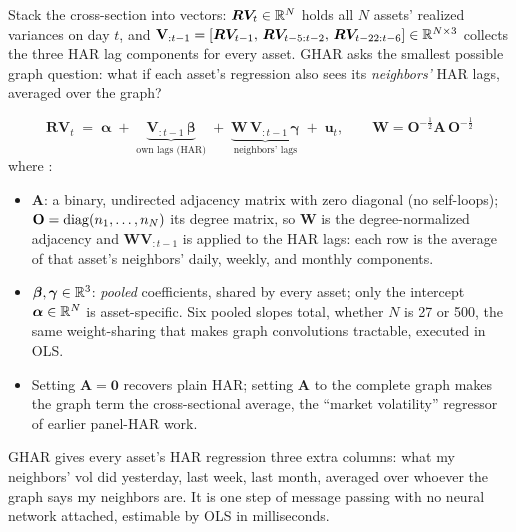 Stack the cross-section into vectors: $\boldsymbol{RV}_t \in \mathbb{R}^N$ holds all $N$ assets' realized variances on day $t$, and $\mathbf{V}_{:t-1} = [\boldsymbol{RV}_{t-1},\, \boldsymbol{RV}_{t-5:t-2},\, \boldsymbol{RV}_{t-22:t-6}] \in \mathbb{R}^{N \times 3}$ collects the three HAR lag components for every asset. GHAR asks the smallest possible graph question: what if each asset's regression also sees its \emph{neighbors'} HAR lags, averaged over the graph?

\begin{equation}\label{eq:gnn:ghar}
  \boldsymbol{RV}_t \;=\; \boldsymbol{\alpha}
  \;+\; \underbrace{\mathbf{V}_{:t-1}\,\bm{\beta}}_{\text{own lags (HAR)}}
  \;+\; \underbrace{\mathbf{W}\,\mathbf{V}_{:t-1}\,\bm{\gamma}}_{\text{neighbors' lags}}
  \;+\; \boldsymbol{u}_t,
  \qquad
  \mathbf{W} = \mathbf{O}^{-\frac{1}{2}} \mathbf{A}\, \mathbf{O}^{-\frac{1}{2}}
\end{equation}
where \citep[eq.~6, p.~8]{ZhangCucuringuDong2023}:
\begin{itemize}[nosep]
  \item $\mathbf{A}$: a binary, undirected adjacency matrix with zero diagonal (no self-loops); $\mathbf{O} = \operatorname{diag}(n_1,\dots,n_N)$ its degree matrix, so $\mathbf{W}$ is the degree-normalized adjacency and $\mathbf{W}\mathbf{V}_{:t-1}$ is  applied to the HAR lags: each row is the average of that asset's neighbors' daily, weekly, and monthly components.
  \item $\bm{\beta}, \bm{\gamma} \in \mathbb{R}^3$: \emph{pooled} coefficients, shared by every asset; only the intercept $\boldsymbol{\alpha} \in \mathbb{R}^N$ is asset-specific. Six pooled slopes total, whether $N$ is 27 or 500, the same weight-sharing that makes graph convolutions tractable, executed in OLS.
  \item Setting $\mathbf{A} = \mathbf{0}$ recovers plain HAR; setting $\mathbf{A}$ to the complete graph makes the graph term the cross-sectional average, the ``market volatility'' regressor of earlier panel-HAR work.
\end{itemize}

\begin{intuition}
GHAR gives every asset's HAR regression three extra columns: what my neighbors' vol did yesterday, last week, last month, averaged over whoever the graph says my neighbors are. It is one step of message passing with no neural network attached, estimable by OLS in milliseconds.
\end{intuition}

